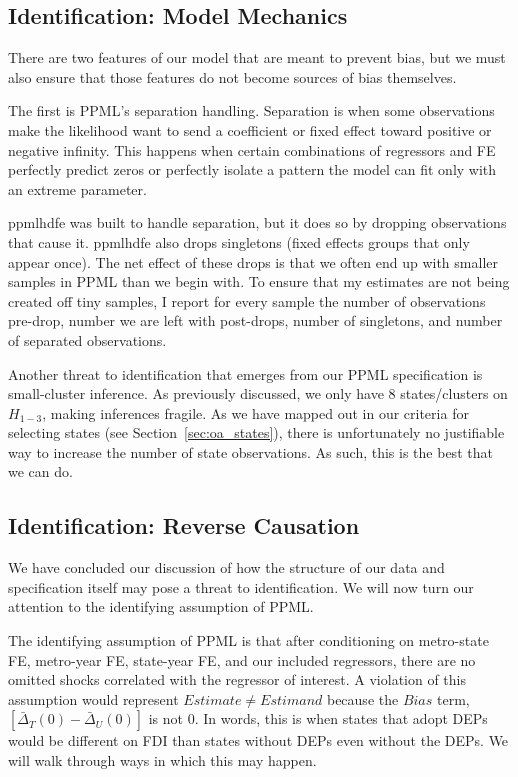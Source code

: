 \documentclass[12pt]{article}
\let\oldsubsection\subsection
\renewcommand{\subsection}{\FloatBarrier\oldsubsection}
\begin{document}
\subsection{Identification: Model Mechanics } \label{ss: model mechanics}

There are two features of our model that are meant to prevent bias, but we must also ensure that those features do not become sources of bias themselves.

The first is PPML's separation handling. Separation is when some observations make the likelihood want to send a coefficient or fixed effect toward positive or negative infinity. This happens when certain combinations of regressors and FE perfectly predict zeros or perfectly isolate a pattern the model can fit only with an extreme parameter. 

ppmlhdfe was built to handle separation, but it does so by dropping observations that cause it. ppmlhdfe also drops singletons (fixed effects groups that only appear once). The net effect of these drops is that we often end up with smaller samples in PPML than we begin with. To ensure that my estimates are not being created off tiny samples, I report for every sample the number of observations pre-drop, number we are left with post-drops, number of singletons, and number of separated observations.

Another threat to identification that emerges from our PPML specification is small-cluster inference. As previously discussed, we only have 8 states/clusters on $H_{1-3}$, making inferences fragile. As we have mapped out in our criteria for selecting states (see Section~\ref{sec:oa_states}), there is unfortunately no justifiable way to increase the number of state observations. As such, this is the best that we can do.

\subsection{Identification: Reverse Causation} \label{ss:logical threats}

We have concluded our discussion of how the structure of our data and specification itself may pose a threat to identification. We will now turn our attention to the identifying assumption of PPML.

The identifying assumption of PPML is that after conditioning on metro-state FE, metro-year FE, state-year FE, and our included regressors, there are no omitted shocks correlated with the regressor of interest. A violation of this assumption would represent $Estimate \neq Estimand$ because the $Bias$ term,  $\left[\bar{\Delta}_T(0)-\bar{\Delta}_U(0)\right]$ is not 0. In words, this is when states that adopt DEPs would be different on FDI than states without DEPs even without the DEPs. We will walk through ways in which this may happen.
\end{document}
